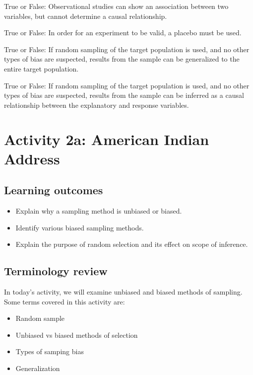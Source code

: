 \documentclass[
]{report}
\begin{document}
True or False: Observational studies can show an association between two variables, but cannot determine a causal relationship.

True or False: In order for an experiment to be valid, a placebo must be used.

True or False: If random sampling of the target population is used, and no other types of bias are suspected, results from the sample can be generalized to the entire target population.

True or False: If random sampling of the target population is used, and no other types of bias are suspected, results from the sample can be inferred as a causal relationship between the explanatory and response variables.

\newpage

\hypertarget{activity-2a-american-indian-address}{%
\section{Activity 2a: American Indian Address}\label{activity-2a-american-indian-address}}


\hypertarget{learning-outcomes-1}{%
\subsection{Learning outcomes}\label{learning-outcomes-1}}

\begin{itemize}
\item
  Explain why a sampling method is unbiased or biased.
\item
  Identify various biased sampling methods.
\item
  Explain the purpose of random selection and its effect on scope of inference.
\end{itemize}

\hypertarget{terminology-review-1}{%
\subsection{Terminology review}\label{terminology-review-1}}

In today's activity, we will examine unbiased and biased methods of sampling. Some terms covered in this activity are:

\begin{itemize}
\item
  Random sample
\item
  Unbiased vs biased methods of selection
\item
  Types of samping bias
\item
  Generalization
\end{itemize}
\end{document}
